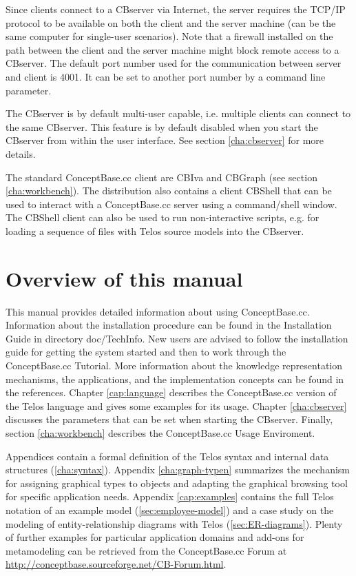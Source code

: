 Since clients connect to a CBserver via Internet, the 
server requires the TCP/IP protocol to be available on both the client and
the server machine (can be the same computer for single-user scenarios).
Note that a firewall installed on the path between the client and
the server machine might block remote access to a CBserver.
The default port number used for the communication between server and
client is 4001. It can be set to another port number by a command line
parameter.

The CBserver is by default multi-user capable, i.e. multiple clients
can connect to the same CBserver. This feature is by default disabled
when you start the CBserver from within the user interface. See
section \ref{cha:cbserver} for more details.

The standard ConceptBase.cc client are CBIva and CBGraph (see section \ref{cha:workbench}).
The distribution also contains a client CBShell that can be used to
interact with a ConceptBase.cc server using a command/shell window.
The CBShell client can also be used to run non-interactive scripts,
e.g. for loading a sequence of files with Telos source models into
the CBserver.




\section{Overview of this manual}
\label{sec:overview}

This manual provides detailed information about using ConceptBase.cc. Information about
the installation procedure can be found in the Installation Guide in
directory doc/TechInfo. New users are advised
to follow the installation guide for
getting the system started and then to work through the ConceptBase.cc
Tutorial. More information about the knowledge representation mechanisms,
the applications, and the implementation concepts can be found in the
references. Chapter \ref{cap:language} describes the ConceptBase.cc version of
the Telos language and gives some examples for its usage. Chapter
\ref{cha:cbserver} discusses the parameters that can be set
when starting the CBserver.
Finally, section
\ref{cha:workbench} describes the ConceptBase.cc Usage Enviroment.

Appendices contain a formal definition of the Telos syntax and internal data
structures (\ref{cha:syntax}). Appendix \ref{cha:graph-typen} summarizes
the mechanism for assigning graphical types to objects and adapting
the graphical browsing tool for specific application needs. Appendix
\ref{cap:examples} contains the full Telos notation of an example model
(\ref{sec:employee-model}) and a case study on the modeling of
entity-relationship diagrams with Telos (\ref{sec:ER-diagrams}).
Plenty of further examples for particular application domains and add-ons for
metamodeling can be retrieved from the ConceptBase.cc Forum at
\url{http://conceptbase.sourceforge.net/CB-Forum.html}. 

